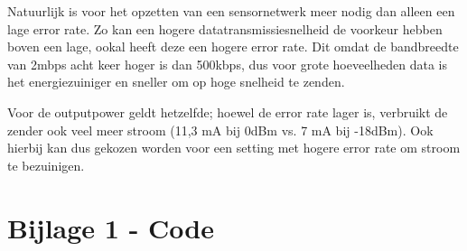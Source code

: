 \documentclass[a4paper,10pt]{article}
\begin{document}
Natuurlijk is voor het opzetten van een sensornetwerk meer nodig dan alleen een lage error rate. Zo kan een hogere datatransmissiesnelheid de voorkeur hebben boven een lage, ookal heeft deze een hogere error rate. Dit omdat de bandbreedte van 2mbps acht keer hoger is dan 500kbps, dus voor grote hoeveelheden data is het energiezuiniger en sneller om op hoge snelheid te zenden.

Voor de outputpower geldt hetzelfde; hoewel de error rate lager is, verbruikt de zender ook veel meer stroom (11,3 mA bij 0dBm vs. 7 mA bij -18dBm). Ook hierbij kan dus gekozen worden voor een setting met hogere error rate om stroom te bezuinigen.

\newpage
\appendix
\section{Bijlage 1 - Code}
\label{sec:code}

\end{document}
